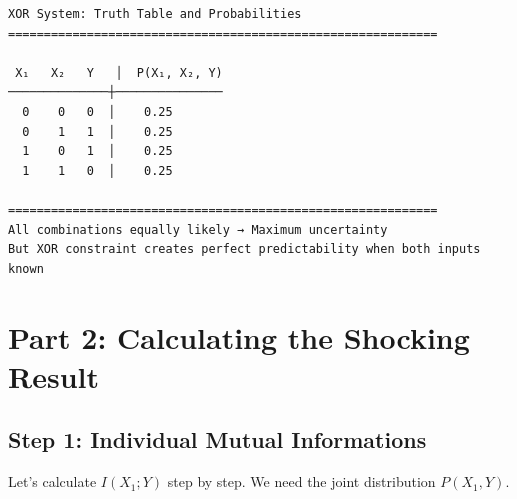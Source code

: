 \documentclass[
  11pt,
  letterpaper,
  oneside,
  openany]{book}
\begin{document}
\begin{verbatim}
XOR System: Truth Table and Probabilities
============================================================

 X₁   X₂   Y   │  P(X₁, X₂, Y)
──────────────┼───────────────
  0    0   0  │    0.25
  0    1   1  │    0.25
  1    0   1  │    0.25
  1    1   0  │    0.25

============================================================
All combinations equally likely → Maximum uncertainty
But XOR constraint creates perfect predictability when both inputs known
\end{verbatim}

\section{Part 2: Calculating the Shocking
Result}\label{part-2-calculating-the-shocking-result}

\subsection{Step 1: Individual Mutual
Informations}\label{step-1-individual-mutual-informations}

Let's calculate \(I(X_1; Y)\) step by step. We need the joint
distribution \(P(X_1, Y)\).
\end{document}
